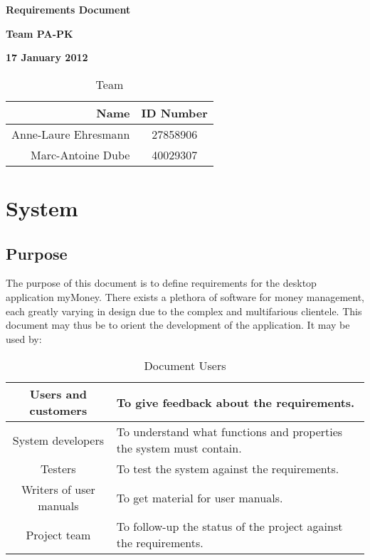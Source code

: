 \documentclass[11pt]{article}
\newcounter{use case ID}
\begin{document}
\vspace*{0.5in}
\centerline{\bf\Large Requirements Document}

\vspace*{0.5in}
\centerline{\bf\Large Team PA-PK}

\vspace*{0.5in}
\centerline{\bf\Large 17 January 2012}

\vspace*{1.5in}
\begin{table}[htbp]
\caption{Team}
\begin{center}
\begin{tabular}{|r | c|}
\hline
Name & ID Number \\
\hline\hline
Anne-Laure Ehresmann & 27858906 \\
\hline
Marc-Antoine Dube & 40029307 \\
\hline
\end{tabular}
\end{center}
\end{table}

\tableofcontents
\listoffigures
\listoftables

\clearpage

\section{System}\subsection{Purpose}

The purpose of this document is to define requirements for the  desktop application myMoney.
There exists a plethora of software for money management, each greatly varying in design due to the complex and multifarious clientele. This document may thus be to orient the development of the application. It may be used by:

\begin{table}[htbp]
\caption{Document Users}
\begin{center}
\begin{tabular}{|c|p{10cm}|}
\hline
Users and customers       & To give feedback about the requirements. \\
\hline
System developers         & To understand what functions and properties the system must contain. \\
\hline
Testers                   & To test the system against the requirements. \\
\hline
Writers of user manuals   & To get material for user manuals. \\
\hline
Project team              & To follow-up the status of the project against the requirements. \\
\hline
\end{tabular}
\end{center}
\end{table}
\end{document}
